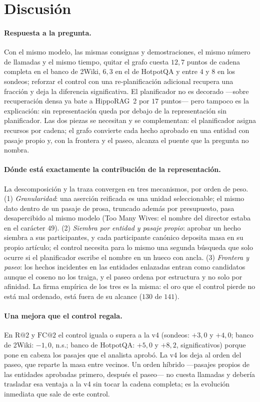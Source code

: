 \documentclass[11pt,a4paper]{article}
\newcommand{\hippo}{HippoRAG~2}
\newcommand{\gl}{\guillemotleft}
\newcommand{\gr}{\guillemotright}
\begin{document}
\section{Discusión}
\label{sec:discusion}

\paragraph{Respuesta a la pregunta.}
Con el mismo modelo, las mismas consignas y demostraciones, el mismo número
de llamadas y el mismo tiempo, quitar el grafo cuesta $12{,}7$ puntos de
cadena completa en el banco de 2Wiki, $6{,}3$ en el de HotpotQA y entre
$4$ y $8$ en los sondeos; reforzar el control con una re-planificación adicional
recupera una fracción y deja la diferencia significativa. El planificador
no es decorado ---sobre recuperación densa ya bate a \hippo{} por $17$
puntos--- pero tampoco es la explicación: sin representación queda por
debajo de la representación sin planificador. Las dos piezas se necesitan y
se complementan: el planificador asigna recursos por cadena; el grafo
convierte cada hecho aprobado en una entidad con pasaje propio y, con la
frontera y el paseo, alcanza el puente que la pregunta no nombra.

\paragraph{Dónde está exactamente la contribución de la representación.}
La descomposición y la traza convergen en tres mecanismos, por orden de
peso. (1) \emph{Granularidad}: una aserción reificada es una unidad
seleccionable; el mismo dato dentro de un pasaje de prosa, truncado además
por presupuesto, pasa desapercibido al mismo modelo (\gl{}Too Many
Wives\gr{}: el nombre del director estaba en el carácter $49$). (2)
\emph{Siembra por entidad y pasaje propio}: aprobar un hecho siembra a sus
participantes, y cada participante canónico deposita masa en su propio
artículo; el control necesita para lo mismo una segunda búsqueda que solo
ocurre si el planificador escribe el nombre en un hueco con ancla. (3)
\emph{Frontera y paseo}: los hechos incidentes en las entidades enlazadas
entran como candidatos aunque el coseno no los traiga, y el paseo ordena
por estructura y no solo por afinidad. La firma empírica de los tres es la
misma: el oro que el control pierde no está mal ordenado, está fuera de su
alcance ($130$ de $141$).

\paragraph{Una mejora que el control regala.}
En $\mathrm{R@}2$ y $\mathrm{FC@}2$ el control iguala o supera a la v4
(sondeos: $+3{,}0$ y $+4{,}0$; banco de 2Wiki: $-1{,}0$, n.s.; banco de
HotpotQA: $+5{,}0$ y $+8{,}2$, significativos) porque pone en cabeza los
pasajes que el analista aprobó. La v4 los deja al orden del paseo, que
reparte la masa entre vecinos. Un orden híbrido ---pasajes propios de las
entidades aprobadas primero, después el paseo--- no cuesta llamadas y
debería trasladar esa ventaja a la v4 sin tocar la cadena completa; es la
evolución inmediata que sale de este control.
\end{document}
